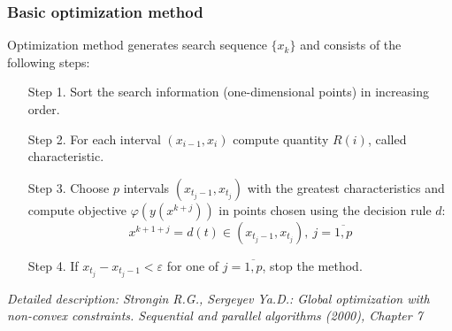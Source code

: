 \documentclass[aspectratio=1610]{beamer}
\begin{document}
\begin{frame}
  \frametitle{Basic optimization method}
  Optimization method generates search sequence \(\{x_k\}\) and consists of the following steps:
  \begin{enumerate}
    \setlength{\itemindent}{.1in}
    \item[Step 1.] Sort the search information (one-dimensional points) in increasing order.
    \item[Step 2.] For each interval \((x_{i-1}, x_i)\) compute quantity \(R(i)\), called characteristic.
    \item[Step 3.] Choose \(p\) intervals \((x_{t_j-1}, x_{t_j})\) with the greatest characteristics and
    compute objective \(\varphi(y(x^{k+j}))\) in points chosen using the decision rule \(d\):
    \begin{displaymath}
      x^{k+1+j}=d(t)\in (x_{t_j-1}, x_{t_j}),\:j=\overline{1,p}
    \end{displaymath}
    \item[Step 4.] If \(x_{t_j}-x_{t_j-1}<\varepsilon\) for one of \(j=\overline{1,p}\), stop the method.
  \end{enumerate}
  \textit{\footnotesize	{Detailed description: Strongin R.G., Sergeyev Ya.D.: Global optimization with non-convex constraints. Sequential and parallel algorithms (2000), Chapter 7}}
\end{frame}
\end{document}
